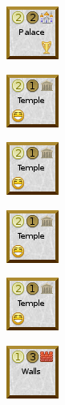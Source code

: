 \documentclass{article}
\begin{document}
\begin{figure}
\begin{subfigure}{}
    \includegraphics[scale=1]{../rules/png/doe_building_palace.png}
  \end{subfigure}
  \begin{subfigure}{}
    \includegraphics[scale=1]{../rules/png/doe_building_temple.png}
  \end{subfigure}
\end{figure}

\begin{figure}
  \begin{subfigure}{}
    \includegraphics[scale=1]{../rules/png/doe_building_temple.png}
  \end{subfigure}
  \begin{subfigure}{}
    \includegraphics[scale=1]{../rules/png/doe_building_temple.png}
  \end{subfigure}
  \begin{subfigure}{}
    \includegraphics[scale=1]{../rules/png/doe_building_temple.png}
  \end{subfigure}
  \begin{subfigure}{}
    \includegraphics[scale=1]{../rules/png/doe_building_walls.png}
  \end{subfigure}
  \begin{subfigure}{}

\end{subfigure}
\end{figure}
\end{document}

